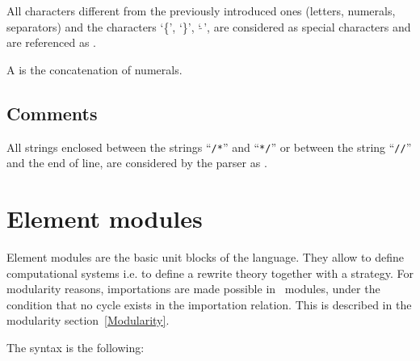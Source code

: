 


\label{elan id}

All characters different from the previously introduced ones (letters,
numerals, separators) and the characters `\{', `\}', `$\tilde{\ }$',
are considered as special characters and are referenced as
.



A  is the concatenation of numerals.


\subsection{Comments}

All strings enclosed between the strings ``\verb|/*|'' and ``\verb|*/|'' or
between the string ``\verb|//|'' and the end of line, are considered by the
parser as .


\section{Element modules}
\label{Element modules}

Element modules are the basic unit blocks of the language. They allow to
define computational systems i.e. to define a rewrite theory together
with a strategy. 
For modularity reasons, importations are made
possible in \elan\ modules, under the condition that no cycle exists
in the importation relation. This is described in the modularity
section~\ref{Modularity}. 

The syntax is the following:



